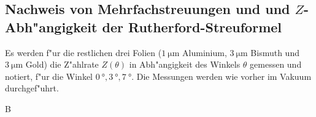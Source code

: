   \subsection{Nachweis von Mehrfachstreuungen und und $Z$-Abh"angigkeit der Rutherford-Streuformel}
    Es werden f"ur die restlichen drei Folien ($\SI{1}{\micro \meter}$ Aluminium, $\SI{3}{\micro \meter}$ Bismuth und $\SI{3}{\micro \meter}$ Gold) die Z"ahlrate $Z(\theta)$ in Abh"angigkeit des Winkels $\theta$ gemessen und notiert, f"ur die Winkel $\SI{0}{\degree},\SI{3}{\degree},\SI{7}{\degree}$.
    Die Messungen werden wie vorher im Vakuum durchgef"uhrt.























  B
